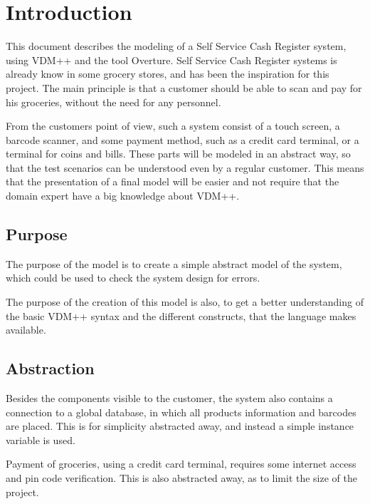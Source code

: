 \chapter{Introduction}
This document describes the modeling of a Self Service Cash Register system, using VDM++ and the tool Overture.
Self Service Cash Register systems is already know in some grocery stores, and has been the inspiration for this project.
The main principle is that a customer should be able to scan and pay for his groceries, without the need for any personnel.


From the customers point of view, such a system consist of a touch screen, a barcode scanner, and some payment method, such as a credit card terminal, or a terminal for coins and bills. These parts will be modeled in an abstract way, so that the test scenarios can be understood even by a regular customer. This means that the presentation of a final model will be easier and not require that the domain expert have a big knowledge about VDM++.

\section{Purpose}
The purpose of the model is to create a simple abstract model of the system, which could be used to check the system design for errors.

The purpose of the creation of this model is also, to get a better understanding of the basic VDM++ syntax and the different constructs, that the language makes available.

\section{Abstraction}
Besides the components visible to the customer, the system also contains a connection to a global database, in which all products information and barcodes are placed. This is for simplicity abstracted away, and instead a simple instance variable is used.

Payment of groceries, using a credit card terminal, requires some internet access and pin code verification. This is also abstracted away, as to limit the size of the project.